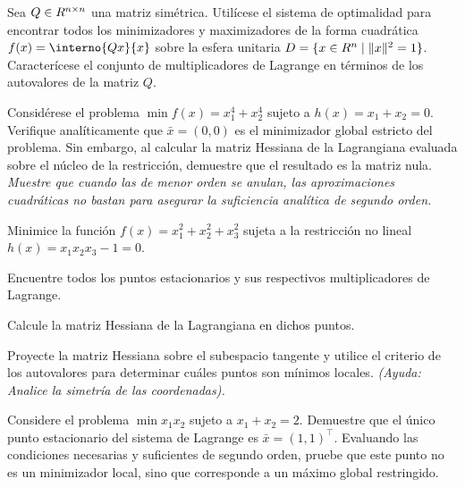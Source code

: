 \begin{exercise}\label{v1:ejer:2.12}
	Sea $Q \in R^{n \times n}$ una matriz simétrica. Utilícese el sistema de optimalidad para encontrar todos los minimizadores y maximizadores de la forma cuadrática $f(x) = \interno{Qx}{x}$ sobre la esfera unitaria $D = \{ x \in R^n \mid \lVert x\rVert^2 = 1 \}$. Caracterícese el conjunto de multiplicadores de Lagrange en términos de los autovalores de la matriz $Q$.
\end{exercise}

\begin{exercise}\label{v1:ejer:2.13}
 Considérese el problema $\min f(x) = x_1^4 + x_2^4$ sujeto a $h(x) = x_1 + x_2 = 0$. Verifique analíticamente que $\bar{x} = (0,0)$ es el minimizador global estricto del problema. Sin embargo, al calcular la matriz Hessiana de la Lagrangiana evaluada sobre el núcleo de la restricción, demuestre que el resultado es la matriz nula. \textit{Muestre que cuando las de menor orden se anulan, las aproximaciones cuadráticas no bastan para asegurar la suficiencia analítica de segundo orden.}
\end{exercise}

\begin{exercise}\label{v1:ejer:2.14}
 Minimice la función $f(x) = x_1^2 + x_2^2 + x_3^2$ sujeta a la restricción no lineal $h(x) = x_1 x_2 x_3 - 1 = 0$.
 \begin{enuthm}
 \item Encuentre todos los puntos estacionarios y sus respectivos multiplicadores de Lagrange.
 \item Calcule la matriz Hessiana de la Lagrangiana en dichos puntos.
 \item Proyecte la matriz Hessiana sobre el subespacio tangente y utilice el criterio de los autovalores para determinar cuáles puntos son mínimos locales. \textit{(Ayuda: Analice la simetría de las coordenadas).}
 \end{enuthm}
\end{exercise}

\begin{exercise}\label{v1:ejer:2.15}
 Considere el problema $\min x_1 x_2$ sujeto a $x_1 + x_2 = 2$. Demuestre que el único punto estacionario del sistema de Lagrange es $\bar{x} = (1,1)^\top$. Evaluando las condiciones necesarias y suficientes de segundo orden, pruebe que este punto no es un minimizador local, sino que corresponde a un máximo global restringido.
\end{exercise}

